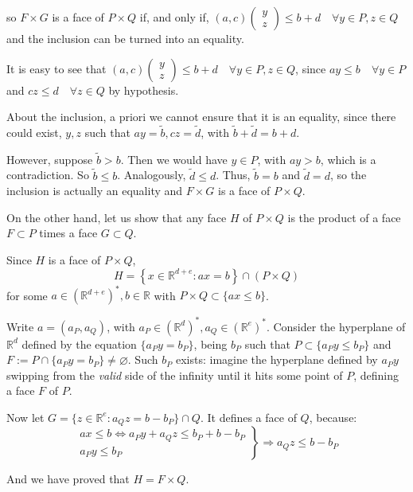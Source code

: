 \documentclass[11pt]{amsart}
\newcommand{\R}{\mathbb{R}}
\theoremstyle{definition}
\begin{document}
\begin{enumerate}
so $F\times G$ is a face of $P\times Q$ if, and only if, $(a,c)
                   \left(\begin{array}{c}
		      y \\ z
		  \end{array}\right)
\leq b+d \quad \forall y\in P, z\in Q$ and the inclusion can be turned into an equality.

It is easy to see that $(a,c)
                   \left(\begin{array}{c}
		      y \\ z
		  \end{array}\right)
\leq b+d \quad \forall y\in P, z\in Q$, since $ay\leq b \quad \forall y\in P$ and $cz\leq d \quad \forall z\in Q$ by hypothesis.

About the inclusion, a priori we cannot ensure that it is an equality, since there could exist, $y,z$ such that $ay=\tilde b, cz=\tilde d$, with $\tilde b + \tilde d = b+d$.

However, suppose $\tilde b > b$. Then we would have $y\in P$, with $ay > b$, which is a contradiction. So $\tilde b \leq b$. Analogously, $\tilde d \leq d$. Thus, $\tilde b = b$ and $\tilde d = d$, so the inclusion is actually an equality and $F\times G$ is a face of $P\times Q$.
\bigskip

On the other hand, let us show that any face $H$ of $P\times Q$ is the product of a face $F\subset P$ times a face $G\subset Q$.

Since $H$ is a face of $P\times Q$,
\[
H=\left\{
x\in\R^{d+e}:ax=b
\right\}\cap (P\times Q)
\]
for some $a\in\left(\R^{d+e}\right)^*, b\in\R$ with $P\times Q\subset \{ax\leq b\}$.

Write $a=(a_P,a_Q)$, with $a_P\in(\R^d)^*, a_Q\in(\R^e)^*$. Consider the hyperplane of $\R^d$ defined by the equation $\{a_Py=b_P\}$, being $b_P$ such that $P\subset\{a_P y\leq b_P\}$ and $F:=P\cap \{a_Py=b_P\} \neq \varnothing$. Such $b_P$ exists: imagine the hyperplane defined by $a_Py$ swipping from the \emph{valid} side of the infinity until it hits some point of $P$, defining a face $F$ of $P$.

Now let $G=\{z\in\R^e : a_Qz=b-b_P\}\cap Q$. It defines a face of $Q$, because:
\[
\left.\begin{array}{l}
  ax\leq b \Leftrightarrow a_Py+a_Qz\leq b_P+b-b_P \\
  a_Py\leq b_P
\end{array}\right\}\Longrightarrow
a_Qz\leq b-b_P
\]

And we have proved that $H=F\times Q$.
\bigskip


\end{enumerate}
\end{document}
